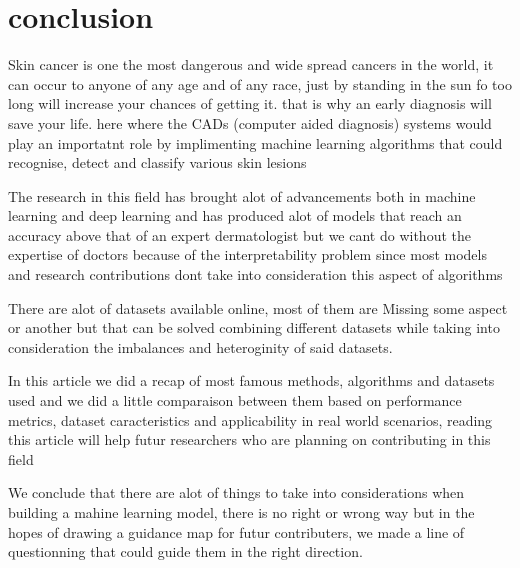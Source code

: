 \section{conclusion}
    Skin cancer is one the most dangerous and wide spread cancers in the world, it can occur to anyone of any age and of any race, just by standing in the sun fo too long will increase your chances of getting it. that is why an early diagnosis will save your life. here where the CADs (computer aided diagnosis) systems would play an importatnt role by implimenting machine learning algorithms that could recognise, detect and classify various skin lesions 

    The research in this field has brought alot of advancements both in machine learning and deep learning and has produced alot of models that reach an accuracy above that of an expert dermatologist but we cant do without the expertise of doctors because of the interpretability problem since most models and research contributions dont take into consideration this aspect of algorithms

    There are alot of datasets available online, most of them are Missing some aspect or another but that can be solved combining different datasets while taking into consideration the imbalances and heteroginity of said datasets.

    In this article we did a recap of most famous methods, algorithms and datasets used and we did a little comparaison between them based on performance metrics, dataset caracteristics and applicability in real world scenarios, reading this article will help futur researchers who are planning on contributing in this field  
    
    We conclude that there are alot of things to take into considerations when building a mahine learning model, there is no right or wrong way but in the hopes of drawing a guidance map for futur contributers, we made a line of questionning that could guide them in the right direction. 





